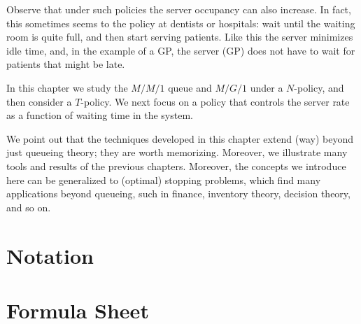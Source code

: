 Observe that under such policies the server occupancy can also increase.
In fact, this sometimes seems to the policy at dentists or hospitals: wait until the waiting room is quite full, and then start serving patients.
Like this the server minimizes idle time, and, in the example of a GP, the server (GP) does not have to wait for patients that might be late.

In this chapter we study the $M/M/1$ queue and $M/G/1$ under a $N$-policy, and then consider a $T$-policy.
We next focus on a policy that controls the server rate as a function of waiting time in the system.


We point out that the techniques developed in this chapter extend (way) beyond just queueing theory; they are worth memorizing.
Moreover, we illustrate many tools and results of the previous chapters.
Moreover, the concepts we introduce here can be generalized to (optimal) stopping problems, which find many applications beyond queueing, such in finance, inventory theory, decision theory, and so on.









%
%
%
%
%


\backmatter





\chapter{Notation}
\label{sec:notation}


\chapter{Formula Sheet}


\printindex





